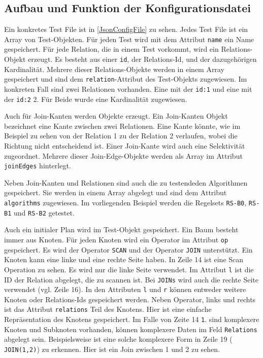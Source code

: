 \subsection{Aufbau und Funktion der Konfigurationsdatei}

Ein konkretes Test File ist in \ref{JsonConfigFile} zu sehen. Jedes Test File ist ein Array von Test-Objekten. Für jeden Test wird mit dem Attribut \texttt{name} ein Name gespeichert. Für jede Relation, die in einem Test vorkommt, wird ein Relations-Objekt erzeugt. Es besteht aus einer \texttt{id}, der Relations-Id, und der dazugehörigen Kardinalität. Mehrere dieser Relations-Objekte werden in einem Array gespeichert und sind dem \texttt{relation}-Attribut des Test-Objekts zugewiesen. Im konkreten Fall sind zwei Relationen vorhanden. Eine mit der \texttt{id:1} und eine mit der \texttt{id:2} 2. Für Beide wurde eine Kardinalität zugewiesen. 

Auch für Join-Kanten werden Objekte erzeugt. Ein Join-Kanten Objekt bezeichnet eine Kante zwischen zwei Relationen. Eine Kante könnte, wie im Beispiel zu sehen von der Relation 1 zu der Relation 2 verlaufen, wobei die Richtung nicht entscheidend ist. Einer Join-Kante wird auch eine Selektivität zugeordnet. Mehrere dieser Join-Edge-Objekte werden als Array im Attribut \texttt{joinEdges} hinterlegt.

Neben Join-Kanten und Relationen sind auch die zu testendeden Algorithmen gespeichert. Sie werden in einem Array abgelegt und sind dem Attribut \texttt{algorithms} zugewiesen. Im vorliegenden Beispiel werden die Regelsets \texttt{RS-B0}, \texttt{RS-B1} und \texttt{RS-B2} getestet.

Auch ein initialer Plan wird im Test-Objekt gespeichert. Ein Baum besteht immer aus Knoten. Für jeden Knoten wird ein Operator im Attribut \texttt{op} gespeichert. Es wird der Operator \texttt{SCAN} und der Operator \texttt{JOIN} unterstützt. Ein Knoten kann eine linke und eine rechte Seite haben. In Zeile 14 ist eine Scan Operation zu sehen. Es wird nur die linke Seite verwendet. Im Attribut \texttt{l} ist die ID der Relation abgelegt, die zu scannen ist. Bei \texttt{JOINs} wird auch die rechte Seite verwendet (vgl. Zeile 16). In den Attributen \texttt{l} und \texttt{r} können entweder weitere Knoten oder Relations-Ids gespeichert werden. Neben Operator, links und rechts ist das Attribut \texttt{relations} Teil des Knotens. Hier ist eine einfache Repräsentation des Knotens gespeichert. Im Falle von Zeite 14 \texttt{1}. sind komplexere Knoten und Subknoten vorhanden, können komplexere Daten im Feld \texttt{Relations} abgelegt sein. Beispielsweise ist eine solche komplexere Form in Zeile 19 ( \texttt{JOIN(1,2)}) zu erkennen. Hier ist ein Join zwischen 1 und 2 zu sehen.

